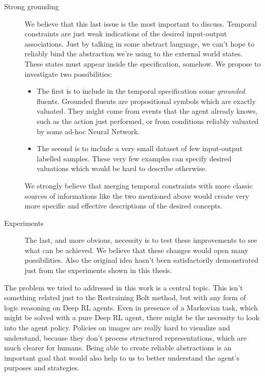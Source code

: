 \begin{description}
	\item [Strong grounding]
		We believe that this last issue is the most important to discuss. Temporal
		constraints are just weak indications of the desired input-output
		associations. Just by talking in some abstract language, we can't hope to
		reliably bind the abstraction we're using to the external world states.
		These states must appear inside the specification, somehow. We propose to
		investigate two possibilities:
		\begin{itemize}
			\item The first is to include in the temporal specification some
				\emph{grounded} fluents. Grounded fluents are propositional symbols
				which are exactly valuated. They might come from events that the
				agent already knows, such as the action just performed, or from
				conditions reliably valuated by some ad-hoc Neural Network.
			\item The second is to include a very small dataset of few input-output
				labelled samples. These very few examples can specify desired
				valuations which would be hard to describe otherwise.
		\end{itemize}
		We strongly believe that merging temporal constraints with more classic
		sources of informations like the two mentioned above would create very
		more specific and effective descriptions of the desired concepts.

	\item [Experiments] The last, and more obvious, necessity is to test 
		these improvements to see what can be achieved. We believe that these
		changes would open many possibilities. Also the original idea hasn't been
		satisfactorily demonstrated just from the experiments shown in this
		thesis.
\end{description}

The problem we tried to addressed in this work is a central topic. This isn't
something related just to the Restraining Bolt method, but with any form of
logic reasoning on Deep RL agents. Even in presence of a Markovian task, which
might be solved with a pure Deep RL agent, there might be the necessity to
look into the agent policy. Policies on images are really hard to visualize
and understand, because they don't process structured representations, which
are much clearer for humans. Being able to create reliable abstractions is an
important goal that would also help to us to better understand the agent's
purposes and strategies.
